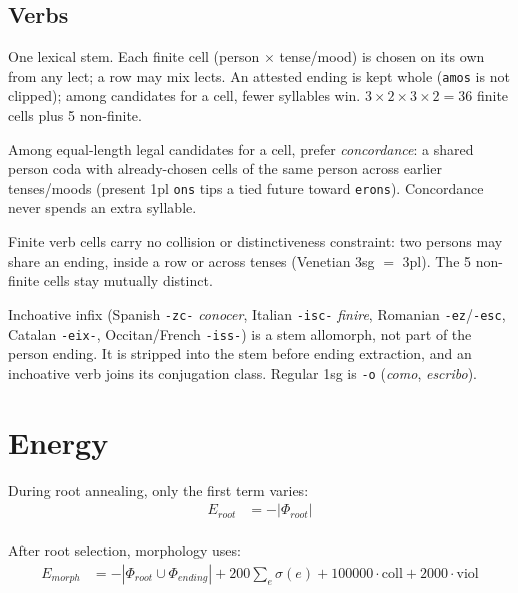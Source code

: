 \documentclass[12pt]{book}
\begin{document}
\section{Verbs}

One lexical stem. Each finite cell (person $\times$ tense/mood) is
chosen on its own from any lect; a row may mix lects. An attested
ending is kept whole (\texttt{amos} is not clipped); among candidates
for a cell, fewer syllables win. $3\times 2\times 3\times 2=36$
finite cells plus 5 non-finite.

Among equal-length legal candidates for a cell, prefer
\emph{concordance}: a shared person coda with already-chosen cells of
the same person across earlier tenses/moods (present 1pl \texttt{ons}
tips a tied future toward \texttt{erons}). Concordance never spends an
extra syllable.

Finite verb cells carry no collision or distinctiveness constraint:
two persons may share an ending, inside a row or across tenses
(Venetian 3sg $=$ 3pl). The 5 non-finite cells stay mutually distinct.

Inchoative infix (Spanish \texttt{-zc-} \emph{conocer}, Italian
\texttt{-isc-} \emph{finire}, Romanian \texttt{-ez}/\texttt{-esc},
Catalan \texttt{-eix-}, Occitan/French \texttt{-iss-}) is a stem
allomorph, not part of the person ending. It is stripped into the stem
before ending extraction, and an inchoative verb joins its conjugation
class. Regular 1sg is \texttt{-o} (\emph{como}, \emph{escribo}).

\chapter{Energy}
\label{ch:energy}

During root annealing, only the first term varies:
\begin{equation}
\begin{aligned}
E_{root} &= -|\Phi_{root}| \\
\end{aligned}
\end{equation}

After root selection, morphology uses:
\begin{equation}
\begin{aligned}
E_{morph} &= -|\Phi_{root}\cup\Phi_{ending}|
  + 200\sum_e \sigma(e)
  + 100000\cdot\mathrm{coll}
  + 2000\cdot\mathrm{viol}
\end{aligned}
\end{equation}
\end{document}
